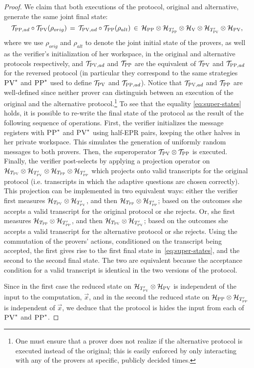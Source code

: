 \documentclass[11pt,letter]{article}
\theoremstyle{remark}
\theoremstyle{definition}
\newcommand{\mH}{\mathcal{H}}
\newcommand{\mT}{\mathcal{T}}
\newcommand{\ver}{\textsc{V}}
\newcommand{\pv}{\textsc{PV}}
\newcommand{\pp}{\textsc{PP}}
\begin{document}
\begin{proof}
We claim that both executions of the protocol, original and alternative, generate the same joint final state: 
\begin{equation}\label{eq:super-states}
\mT_{\pp,ad}\circ\mT_\pv(\rho_{orig}) \,=\, \mT_{\pv,ad}\circ \mT_\pp(\rho_{alt}) \,\in\,  \mH_{\pp}\otimes \mH_{T'_{\pp}} \otimes \mH_\ver \otimes \mH_{T'_\pv} \otimes \mH_\pv,
\end{equation}
where we use $\rho_{orig}$ and $\rho_{alt}$ to denote the joint initial state
  of the provers, as well as the verifier's initialization of her workspace, in
  the original and alternative protocols respectively, and $\mT_{\pv,ad}$ and $\mT_\pp$ are the equivalent of $\mT_\pv$ and $\mT_{\pp,ad}$ for the reversed protocol (in particular they correspond to the same strategies $\pv^*$ and $\pp^*$ used to define $\mT_\pv$ and  $\mT_{\pp,ad}$). Notice that $\mT_{\pv,ad}$ and $\mT_\pp$ are well-defined since neither prover can distinguish between an execution of the original and the alternative protocol.\footnote{One must ensure that a prover does not realize if the  alternative protocol is executed instead of the original; this is easily enforced by only interacting with any of the provers at specific, publicly decided times.}
To see that the equality \eqref{eq:super-states}
  holds, it is possible to re-write the final state of the protocol as the
  result of the following sequence of operations. First, the verifier
  initializes the message registers with $\pp^*$ and $\pv^*$ using half-EPR
  pairs, keeping the other halves in her private workspace. This simulates the
  generation of uniformly random messages to both provers. Then, the
  superoperator $\mT_\pv \otimes \mT_\pp$ is executed. Finally, the verifier
  post-selects by applying a projection operator on $\mH_{T_\pv} \otimes \mH_{T'_\pv} \otimes \mH_{T_\pp} \otimes \mH_{T'_\pp}$ which projects onto valid transcripts for the
  original protocol (i.e. transcripts in which the adaptive questions are chosen
  correctly). This projection can be implemented in two equivalent ways: either
  the verifier first measures $ \mH_{T_\pv} \otimes \mH_{T'_\pv}$, and then
  $\mH_{T_\pp} \otimes \mH_{T'_\pp}$; based on the outcomes she accepts a valid transcript for the
  original protocol or she rejects. Or, she first measures $ \mH_{T_\pp} \otimes \mH_{T'_\pp}$, and then
  $\mH_{T_\pv} \otimes \mH_{T'_\pv}$; based on the outcomes she accepts a
  valid transcript for the alternative protocol or she rejects. Using the
  commutation of the provers' actions, conditioned on the transcript being
  accepted, the first gives rise to the first final state
  in~\eqref{eq:super-states}, and the second to the second final state. The two are equivalent because the acceptance condition for a valid transcript is identical in the two versions of the protocol.

Since in the first case the reduced state on $\mH_{T'_{\pv}} \otimes \mH_\pv$ is independent of the input to the computation, $\vec{x}$, and in the second  the reduced state on $ \mH_\pp\otimes \mH_{T'_{\pp}} $ is independent of $\vec{x}$, we deduce that the protocol is hides the input from each of $\pv^*$ and $\pp^*$. 
\end{proof}
\end{document}
